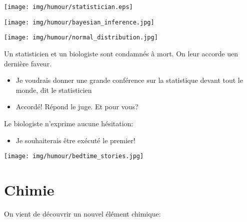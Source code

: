	\begin{center}\underline{\hspace{5 cm}}\end{center}
	\begin{center}
	\texttt{[image: img/humour/statistician.eps]}
	\end{center}
	
	\begin{center}\underline{\hspace{5 cm}}\end{center}		
	\begin{center}
	\texttt{[image: img/humour/bayesian\_inference.jpg]}
	\end{center}
	
	\begin{center}\underline{\hspace{5 cm}}\end{center}
	\begin{center}
	\texttt{[image: img/humour/normal\_distribution.jpg]}
	\end{center}
	
	\pagebreak
	Un statisticien et un biologiste sont condamnés à mort. On leur accorde uen dernière faveur.
	\begin{itemize}
		\item Je voudrais donner une grande conférence sur la statistique devant tout le monde, dit le statisticien
		\item Accordé! Répond le juge. Et pour vous?
	\end{itemize}
	Le biologiste n'exprime aucune hésitation:
	\begin{itemize}
		\item Je souhaiterais être exécuté le premier!
	\end{itemize}
	\begin{center}\underline{\hspace{5 cm}}\end{center}
	\begin{center}
	\texttt{[image: img/humour/bedtime\_stories.jpg]}
	\end{center}
		
	\pagebreak
	\section{Chimie}

On vient de découvrir un nouvel élément chimique:

